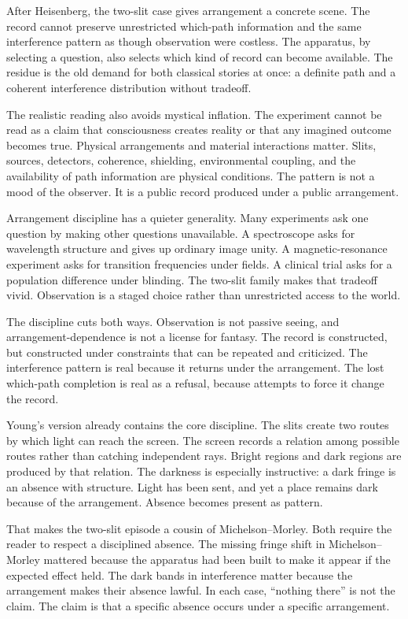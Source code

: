 After Heisenberg, the two-slit case gives arrangement a concrete scene. The
record cannot preserve unrestricted which-path information and the same
interference pattern as though observation were costless. The apparatus, by
selecting a question, also selects which kind of record can become
available. The residue is the old demand for both classical stories at once:
a definite path and a coherent interference distribution without tradeoff.

The realistic reading also avoids mystical inflation. The experiment cannot
be read as a claim that consciousness creates reality or that any imagined
outcome becomes true. Physical arrangements and material interactions matter.
Slits, sources, detectors, coherence, shielding, environmental coupling, and
the availability of path information are physical conditions. The pattern is
not a mood of the observer. It is a public record produced under a public
arrangement.

Arrangement discipline has a quieter generality. Many experiments ask one
question by making other questions unavailable. A spectroscope asks for
wavelength structure and gives up ordinary image unity. A magnetic-resonance
experiment asks for transition frequencies under fields. A clinical trial
asks for a population difference under blinding. The two-slit family makes
that tradeoff vivid. Observation is a staged choice rather than unrestricted
access to the world.

The discipline cuts both ways. Observation is not passive seeing, and
arrangement-dependence is not a license for fantasy. The record is
constructed, but constructed under constraints that can be repeated and
criticized. The interference pattern is real because it returns under the
arrangement. The lost which-path completion is real as a refusal, because
attempts to force it change the record.

Young's version already contains the core discipline. The slits create two
routes by which light can reach the screen. The screen records a relation
among possible routes rather than catching independent rays. Bright regions
and dark regions are produced by that relation. The darkness is especially
instructive: a dark fringe is an absence with structure. Light has been sent,
and yet a place remains dark because of the arrangement. Absence becomes
present as pattern.

That makes the two-slit episode a cousin of Michelson--Morley. Both require
the reader to respect a disciplined absence. The missing fringe shift in
Michelson--Morley mattered because the apparatus had been built to make it
appear if the expected effect held. The dark bands in interference matter
because the arrangement makes their absence lawful. In each case, ``nothing
there'' is not the claim. The claim is that a specific absence occurs under
a specific arrangement.

